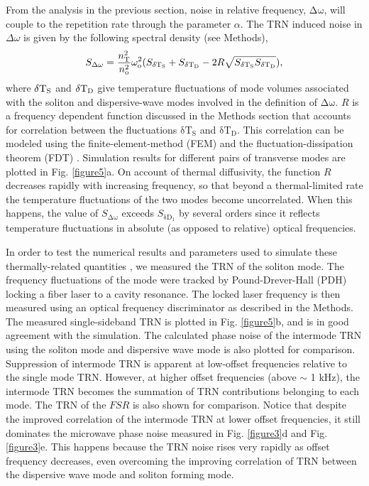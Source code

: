 \documentclass[noshowpacs,amsmath,
twocolumn,
superscriptaddress,
8pt,
aps,prb]{revtex4-2}
\begin{document}
From the analysis in the previous section, noise in relative frequency, $\mathrm{\Delta\omega}$, will couple to the repetition rate through the parameter $\alpha$. The TRN induced noise in $\Delta\omega$ is given by the following spectral density (see Methods),
\begin{equation}
    S_{\Delta\omega}=\frac{n_{\rm T}^2}{n_{\rm o}^2}\omega_{\rm o}^2 (S_{{\mathrm{\delta T_S}}}+S_{{\mathrm{\delta T_D}}}-2 R \sqrt{S_{{\mathrm{\delta T_S}}} S_{{\mathrm{\delta T_D}}}}),
    \label{Eq:dtvscorr}
\end{equation}
where $\mathrm{\delta T}_{\rm S}$ and $\mathrm{\delta T}_{\rm D}$ give temperature fluctuations of mode volumes associated with the soliton and dispersive-wave modes involved in the definition of $\mathrm{\Delta\omega}$. $R$ is a frequency dependent function discussed in the Methods section that accounts for correlation between the fluctuations $\mathrm{\delta T_S}$ and $\mathrm{\delta T_D}$. This correlation can be modeled using the finite-element-method (FEM) and the fluctuation-dissipation theorem (FDT) \cite{levin2008fluctuation,kondratiev2018thermorefractive,huang2019thermorefractive}. Simulation results for different pairs of transverse modes are plotted in Fig. \ref{figure5}a. On account of thermal diffusivity, the function $R$ decreases rapidly with increasing frequency, so that beyond a thermal-limited rate the temperature fluctuations of the two modes become uncorrelated. When this happens, the value of $S_{\mathrm{\Delta\omega}}$ exceeds $S_{\mathrm{\delta D_1}}$ by several orders since it reflects temperature fluctuations in absolute (as opposed to relative) optical frequencies. 


In order to test the numerical results and parameters used to simulate these thermally-related quantities \cite{kondratiev2018thermorefractive,huang2019thermorefractive}, we measured the TRN of the soliton mode. The frequency fluctuations of the mode were tracked by Pound-Drever-Hall (PDH) locking a fiber laser to a cavity resonance.  The locked laser frequency is then measured using an optical frequency discriminator as described in the Methods. The measured single-sideband TRN is plotted in Fig. \ref{figure5}b, and is in good agreement with the simulation. The calculated phase noise of the intermode TRN using the soliton mode and dispersive wave mode is also plotted for comparison.  Suppression of intermode TRN is apparent at low-offset frequencies relative to the single mode TRN. However, at higher offset frequencies (above $\sim$ 1 kHz), the intermode TRN becomes the summation of TRN contributions belonging to each mode. The TRN of the $FSR$ is also shown for comparison. Notice that despite the improved correlation of the intermode TRN at lower offset frequencies, it still dominates the microwave phase noise measured in Fig. \ref{figure3}d and Fig. \ref{figure3}e. This happens because the TRN noise rises very rapidly as offset frequency decreases, even overcoming the improving correlation of TRN between the dispersive wave mode and soliton forming mode. 
\end{document}
